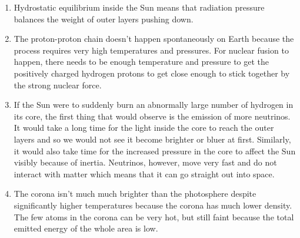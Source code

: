 \documentclass[../hw2.tex]{subfiles}
\begin{document}
    \begin{enumerate}
        \item {} Hydrostatic equilibrium inside the Sun means that radiation pressure balances the weight of outer layers pushing down.
        \item {} The proton-proton chain doesn't happen spontaneously on Earth because the process requires very high temperatures and pressures. For nuclear fusion to happen, there needs to be enough temperature and pressure to get the positively charged hydrogen protons to get close enough to stick together by the strong nuclear force.
        \item {} If the Sun were to suddenly burn an abnormally large number of hydrogen in its core, the first thing that would observe is the emission of more neutrinos. It would take a long time for the light inside the core to reach the outer layers and so we would not see it become brighter or bluer at first. Similarly, it would also take time for the increased pressure in the core to affect the Sun visibly because of inertia. Neutrinos, however, move very fast and do not interact with matter which means that it can go straight out into space.
        \item {} The corona isn't much much brighter than the photosphere despite significantly higher temperatures because the corona has much lower density. The few atoms in the corona can be very hot, but still faint because the total emitted energy of the whole area is low. %
    \end{enumerate}
    
\end{document}
